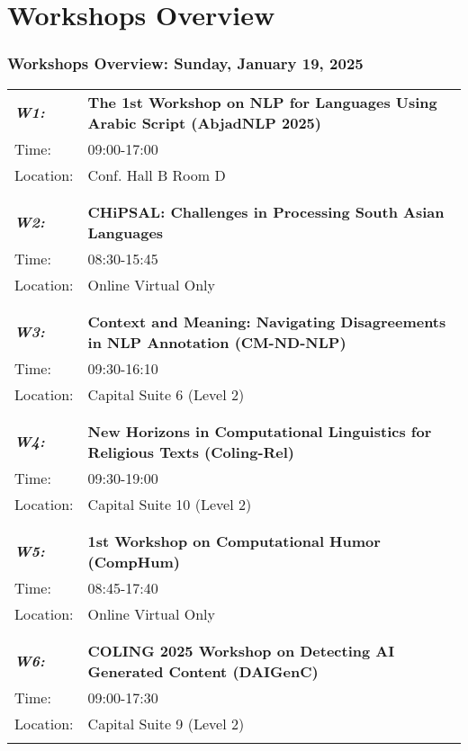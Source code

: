 \chapter{Workshops Overview}
\subsection{Workshops Overview: Sunday, January 19, 2025}
\begin{longtable}{p{15mm}p{100mm}}
\emph{\textbf{W1:}} & \textbf{The 1st Workshop on NLP for Languages Using Arabic Script (AbjadNLP 2025)} \\
Time: & 09:00-17:00 \\
Location: & Conf. Hall B Room D \\\\
\hline\\
\emph{\textbf{W2:}} & \textbf{CHiPSAL: Challenges in Processing South Asian Languages} \\
Time: & 08:30-15:45 \\
Location: & Online Virtual Only \\\\
\hline\\
\emph{\textbf{W3:}} & \textbf{Context and Meaning: Navigating Disagreements in NLP Annotation (CM-ND-NLP)} \\
Time: & 09:30-16:10 \\
Location: & Capital Suite 6 (Level 2) \\\\
\hline\\
\emph{\textbf{W4:}} & \textbf{New Horizons in Computational Linguistics for Religious Texts (Coling-Rel)} \\
Time: & 09:30-19:00 \\
Location: & Capital Suite 10 (Level 2) \\\\
\hline\\
\emph{\textbf{W5:}} & \textbf{1st Workshop on Computational Humor (CompHum)} \\
Time: & 08:45-17:40 \\
Location: & Online Virtual Only \\\\
\hline\\
\emph{\textbf{W6:}} & \textbf{COLING 2025 Workshop on Detecting AI Generated Content (DAIGenC)} \\
Time: & 09:00-17:30 \\
Location: & Capital Suite 9 (Level 2) \\\\

\end{longtable}
